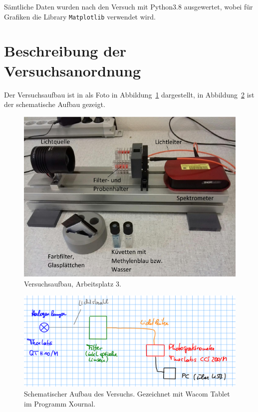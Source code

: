 \documentclass{article}
\begin{document}
Sämtliche Daten wurden nach den Versuch mit Python3.8 ausgewertet, wobei für Grafiken die Library \texttt{Matplotlib} verwendet wird. 




\section{Beschreibung der Versuchsanordnung}

Der Versuchsaufbau ist in als Foto in Abbildung~\ref{fig:aufbau} dargestellt, in Abbildung~\ref{fig:aufbau2} ist der schematische Aufbau gezeigt.

\begin{figure}[H]
\caption{Versuchsaufbau, Arbeitsplatz 3.}
\label{fig:aufbau}
\includegraphics[scale=1.4]{aufbau.png}
\end{figure}


\begin{figure}[H]
\caption{Schematischer Aufbau des Versuchs. Gezeichnet mit Wacom Tablet im Programm Xournal.}
\label{fig:aufbau2}
\includegraphics[scale=1.]{aufbau2.png}
\end{figure}
\end{document}
